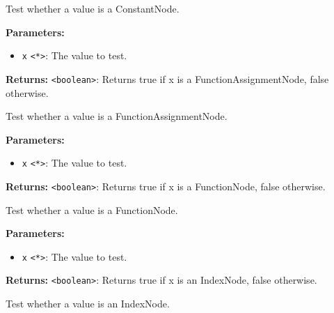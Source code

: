 \documentclass[12pt,a4paper]{article}
\begin{document}
\noindent Test whether a value is a ConstantNode.

\vspace{5mm}
\noindent {}


\noindent \textbf{Parameters:}
\begin{itemize}
  \item \texttt{x} \texttt{<*>}: The value to test.
\end{itemize}

\noindent \textbf{Returns:} \texttt{<boolean>}: Returns true if \textasciigrave{}x\textasciigrave{} is a FunctionAssignmentNode, false otherwise.

\noindent Test whether a value is a FunctionAssignmentNode.

\vspace{5mm}
\noindent {}


\noindent \textbf{Parameters:}
\begin{itemize}
  \item \texttt{x} \texttt{<*>}: The value to test.
\end{itemize}

\noindent \textbf{Returns:} \texttt{<boolean>}: Returns true if \textasciigrave{}x\textasciigrave{} is a FunctionNode, false otherwise.

\noindent Test whether a value is a FunctionNode.

\vspace{5mm}
\noindent {}


\noindent \textbf{Parameters:}
\begin{itemize}
  \item \texttt{x} \texttt{<*>}: The value to test.
\end{itemize}

\noindent \textbf{Returns:} \texttt{<boolean>}: Returns true if \textasciigrave{}x\textasciigrave{} is an IndexNode, false otherwise.

\noindent Test whether a value is an IndexNode.

\vspace{5mm}
\noindent {}
\end{document}
